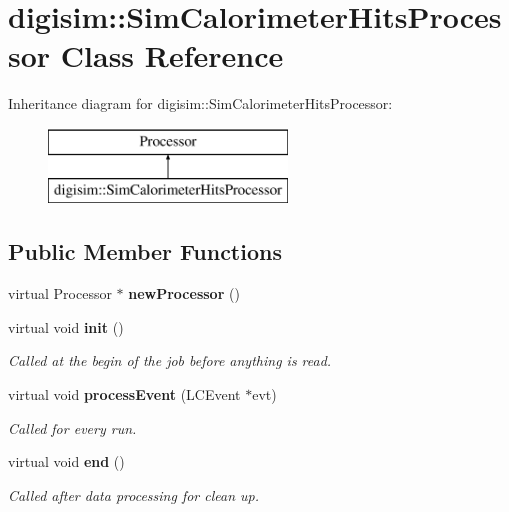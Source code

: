 \section{digisim\-:\-:Sim\-Calorimeter\-Hits\-Processor Class Reference}
\label{classdigisim_1_1SimCalorimeterHitsProcessor}
Inheritance diagram for digisim\-:\-:Sim\-Calorimeter\-Hits\-Processor\-:\begin{figure}[H]
\begin{center}
\leavevmode
\includegraphics[height=2.000000cm]{classdigisim_1_1SimCalorimeterHitsProcessor}
\end{center}
\end{figure}
\subsection*{Public Member Functions}
\begin{DoxyCompactItemize}
\item 
virtual Processor $\ast$ {\bfseries new\-Processor} ()\label{classdigisim_1_1SimCalorimeterHitsProcessor_a0167d5d99f039550ff02ae2c6053f1e4}

\item 
virtual void {\bf init} ()
\begin{DoxyCompactList}\small\item\em Called at the begin of the job before anything is read. \end{DoxyCompactList}\item 
virtual void {\bf process\-Event} (L\-C\-Event $\ast$evt)
\begin{DoxyCompactList}\small\item\em Called for every run. \end{DoxyCompactList}\item 
virtual void {\bf end} ()\label{classdigisim_1_1SimCalorimeterHitsProcessor_a415577954cca081b450fd0a608560529}

\begin{DoxyCompactList}\small\item\em Called after data processing for clean up. \end{DoxyCompactList}\end{DoxyCompactItemize}
